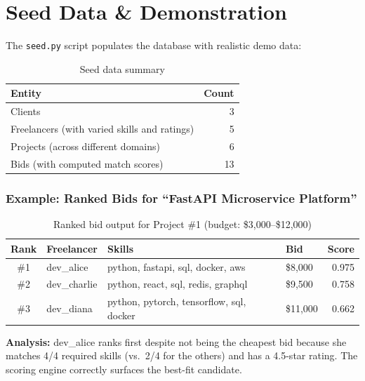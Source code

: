 \documentclass[12pt, a4paper]{report}
\begin{document}
\chapter{Seed Data \& Demonstration}

The \texttt{seed.py} script populates the database with realistic demo data:

\begin{table}[H]
\centering
\caption{Seed data summary}
\begin{tabular}{@{}lr@{}}
\toprule
\textbf{Entity} & \textbf{Count} \\
\midrule
Clients & 3 \\
Freelancers (with varied skills and ratings) & 5 \\
Projects (across different domains) & 6 \\
Bids (with computed match scores) & 13 \\
\bottomrule
\end{tabular}
\end{table}

\subsection{Example: Ranked Bids for ``FastAPI Microservice Platform''}

\begin{table}[H]
\centering
\caption{Ranked bid output for Project \#1 (budget: \$3,000--\$12,000)}
\begin{tabular}{@{}clllr@{}}
\toprule
\textbf{Rank} & \textbf{Freelancer} & \textbf{Skills} & \textbf{Bid} & \textbf{Score} \\
\midrule
\#1 & dev\_alice & python, fastapi, sql, docker, aws & \$8,000 & 0.975 \\
\#2 & dev\_charlie & python, react, sql, redis, graphql & \$9,500 & 0.758 \\
\#3 & dev\_diana & python, pytorch, tensorflow, sql, docker & \$11,000 & 0.662 \\
\bottomrule
\end{tabular}
\end{table}

\textbf{Analysis:} dev\_alice ranks first despite not being the cheapest bid because she matches 4/4 required skills (vs.\ 2/4 for the others) and has a 4.5-star rating. The scoring engine correctly surfaces the best-fit candidate.
\end{document}
